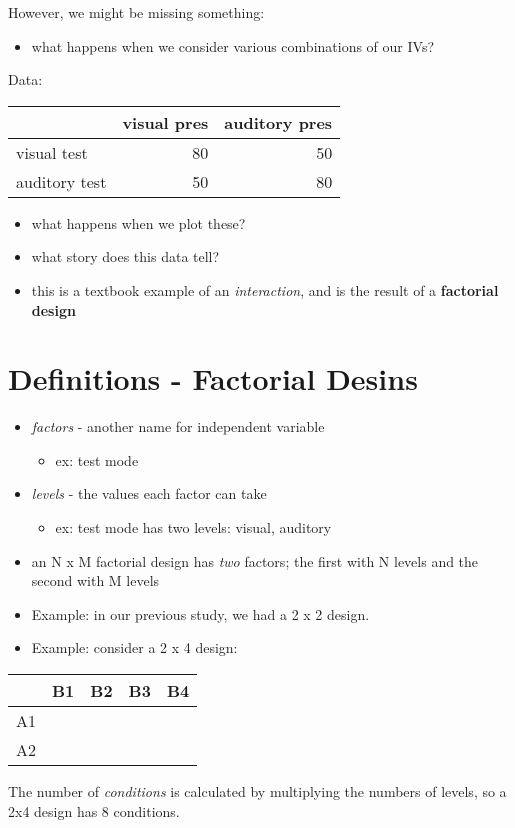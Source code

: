 \documentclass[11pt]{article}
\begin{document}
However, we might be missing something:
\begin{itemize}
\item what happens when we consider various combinations of our IVs?
\end{itemize}

Data:

\begin{center}
\begin{tabular}{lrr}
 & visual pres & auditory pres\\
\hline
visual test & 80 & 50\\
auditory test & 50 & 80\\
\end{tabular}
\end{center}

\begin{itemize}
\item what happens when we plot these?
\item what story does this data tell?
\item this is a textbook example of an \emph{interaction}, and is the result of a \textbf{factorial design}
\end{itemize}

\section*{Definitions - Factorial Desins}
\label{sec-2}
\begin{itemize}
\item \emph{factors} - another name for independent variable
\begin{itemize}
\item ex: test mode
\end{itemize}
\item \emph{levels} - the values each factor can take
\begin{itemize}
\item ex: test mode has two levels: visual, auditory
\end{itemize}
\item an N x M factorial design has \emph{two} factors; the first with N levels and the second with M levels
\item Example: in our previous study, we had a 2 x 2 design.
\item Example: consider a 2 x 4 design:
\end{itemize}

\begin{center}
\begin{tabular}{lllll}
 & B1 & B2 & B3 & B4\\
\hline
A1 &  &  &  & \\
A2 &  &  &  & \\
\end{tabular}
\end{center}

The number of \emph{conditions} is calculated by multiplying the numbers of levels, so a 2x4 design has 8 conditions.
\end{document}

